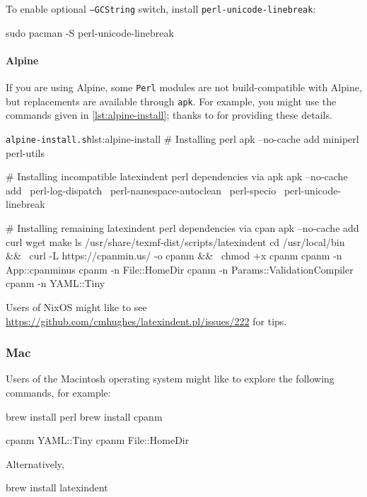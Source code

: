 \documentclass[10pt]{article}
\begin{document}
   To enable optional \texttt{--GCString} switch, install
   \texttt{perl-unicode-linebreak}:

   \begin{commandshell}
sudo pacman -S perl-unicode-linebreak
\end{commandshell}

  \paragraph{Alpine}
   If you are using Alpine, some \texttt{Perl} modules are not build-compatible with
   Alpine, but replacements are available through \texttt{apk}. For example, you might
   use the commands given in \cref{lst:alpine-install}; thanks to \cite{jun-sheaf} for
   providing these details.

   \begin{cmhlistings}[style=tcblatex,language=Bash]{\texttt{alpine-install.sh}}{lst:alpine-install}
# Installing perl
apk --no-cache add miniperl perl-utils

# Installing incompatible latexindent perl dependencies via apk
apk --no-cache add \
    perl-log-dispatch \
    perl-namespace-autoclean \
    perl-specio \
    perl-unicode-linebreak

# Installing remaining latexindent perl dependencies via cpan
apk --no-cache add curl wget make
ls /usr/share/texmf-dist/scripts/latexindent
cd /usr/local/bin && \
    curl -L https://cpanmin.us/ -o cpanm && \
    chmod +x cpanm
cpanm -n App::cpanminus
cpanm -n File::HomeDir
cpanm -n Params::ValidationCompiler
cpanm -n YAML::Tiny
\end{cmhlistings}

   Users of NixOS might like to see
   \href{https://github.com/cmhughes/latexindent.pl/issues/222}{https://github.com/cmhughes/latexindent.pl/issues/222}
   for tips.
 \subsubsection{Mac}
  Users of the Macintosh operating system might like to explore the following commands,
  for example:

  \begin{commandshell}
brew install perl
brew install cpanm

cpanm YAML::Tiny
cpanm File::HomeDir
\end{commandshell}

  Alternatively,

  \begin{commandshell}
brew install latexindent
\end{commandshell}
\end{document}
